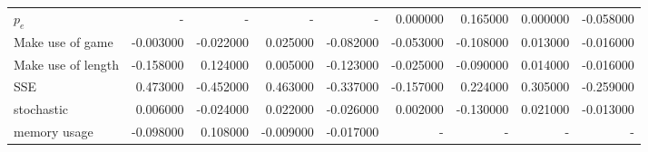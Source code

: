 \begin{tabular}{lrrrrrrrr}
$p_e$ & - & - & - & - & 0.000000 & 0.165000 & 0.000000 & -0.058000 \\
Make use of game & -0.003000 & -0.022000 & 0.025000 & -0.082000 & -0.053000 & -0.108000 & 0.013000 & -0.016000 \\
Make use of length & -0.158000 & 0.124000 & 0.005000 & -0.123000 & -0.025000 & -0.090000 & 0.014000 & -0.016000 \\
SSE & 0.473000 & -0.452000 & 0.463000 & -0.337000 & -0.157000 & 0.224000 & 0.305000 & -0.259000 \\
stochastic & 0.006000 & -0.024000 & 0.022000 & -0.026000 & 0.002000 & -0.130000 & 0.021000 & -0.013000 \\
memory usage & -0.098000 & 0.108000 & -0.009000 & -0.017000 & - & - & - & - \\
\end{tabular}

